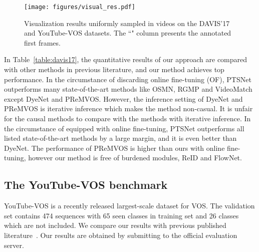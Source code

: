 \documentclass[10pt,twocolumn,letterpaper]{article}
\begin{document}
    \begin{figure*}[!t]
    	\centering
    	\texttt{[image: figures/visual\_res.pdf]}
    	\caption{Visualization results uniformly sampled in videos on the DAVIS'17 and YouTube-VOS datasets. The ``" column presents the annotated first frames.}
    	\label{fig:visual_res}
    \end{figure*}

In Table~\ref{table:davis17}, the quantitative results of our approach are compared with other methods in previous literature, and our method achieves top performance. In the circumstance of discarding online fine-tuning (OF), PTSNet outperforms many state-of-the-art methods like OSMN, RGMP and VideoMatch except DyeNet and PReMVOS. However, the inference setting of DyeNet and PReMVOS is iterative inference which makes the method non-casual. It is unfair for the causal methods to compare with the methods with iterative inference. In the circumstance of equipped with online fine-tuning, PTSNet outperforms all listed state-of-the-art methods by a large margin, and it is even better than DyeNet. The performance of PReMVOS is higher than ours with online fine-tuning, however our method is free of burdened modules, \eg ReID and FlowNet.







\subsection{The YouTube-VOS benchmark}
YouTube-VOS is a recently released largest-scale dataset for VOS. The validation set contains 474 sequences with 65 seen classes in training set and 26 classes which are not included. We compare our results with previous published literature~\cite{yvos_eccv18, appearance_model_for_end2end_vos_arxiv1811}. Our results are obtained by submitting to the official evaluation server.
\end{document}
